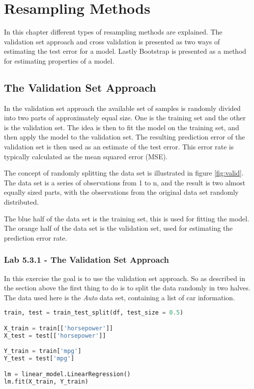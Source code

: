 \chapter{Resampling Methods}
\label{chp:crossvalidation}
In this chapter different types of resampling methods are explained. The validation set approach and cross validation is presented as two ways of estimating the test error for a model. Lastly Bootstrap is presented as a method for estimating properties of a model.

\section{The Validation Set Approach}
\label{sec:VSA}
In the validation set approach the available set of samples is randomly divided into two parts of approximately equal size. One is the training set and the other is the validation set. The idea is then to fit the model on the training set, and then apply the model to the validation set. The resulting prediction error of the validation set is then used as an estimate of the test error. This error rate is typically calculated as the mean squared error (MSE). 


The concept of randomly splitting the  data set is illustrated in figure \ref{fig:valid}. The  data set is a series of observations from 1 to n, and the result is two almost equally sized parts, with the observations from the original  data set randomly distributed. 

The blue half of the  data set is the training set, this is used for fitting the model. The orange half of the data set is the validation set, used for estimating the prediction error rate.


\subsection{Lab 5.3.1 - The Validation Set Approach}
In this exercise the goal is to use the validation set approach. So as described in the section above the first thing to do is to split the data randomly in two halves. The data used here is the \emph{Auto}  data set, containing a list of car information. 

\newpage

\begin{lstlisting}[language=Python, label=lst:fit_valid, caption=Fitting linear regression]
train, test = train_test_split(df, test_size = 0.5)

X_train = train[['horsepower']]
X_test = test[['horsepower']]

Y_train = train['mpg']
Y_test = test['mpg']

lm = linear_model.LinearRegression()
lm.fit(X_train, Y_train)
\end{lstlisting}

